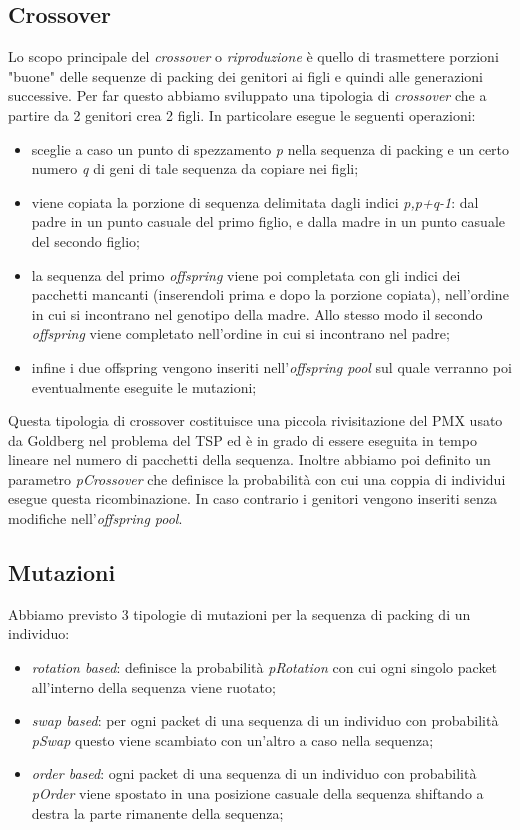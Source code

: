 \subsection{Crossover}
Lo scopo principale del \emph{crossover} o \emph{riproduzione} è quello di trasmettere porzioni "buone" delle sequenze di packing dei genitori ai figli e quindi alle generazioni successive. Per far questo abbiamo sviluppato una tipologia di \emph{crossover} che a partire da 2 genitori crea 2 figli. In particolare esegue le seguenti operazioni:
\begin{itemize}
\item sceglie a caso un punto di spezzamento \emph{p} nella sequenza di packing e un certo numero \emph{q} di geni di tale sequenza da copiare nei figli;
\item viene copiata la porzione di sequenza delimitata dagli indici \emph{p,p+q-1}: dal padre in un punto casuale del primo figlio, e dalla madre in un punto casuale del secondo figlio;
\item la sequenza del primo \emph{offspring} viene poi completata con gli indici dei pacchetti mancanti (inserendoli prima e dopo la porzione copiata), nell'ordine in cui si incontrano nel genotipo della madre. Allo stesso modo il secondo \emph{offspring} viene completato nell'ordine in cui si incontrano nel padre;
\item infine i due offspring vengono inseriti nell'\emph{offspring pool} sul quale verranno poi eventualmente eseguite le mutazioni;
\end{itemize}
Questa tipologia di crossover costituisce una piccola rivisitazione del PMX usato da Goldberg nel problema del TSP ed è in grado di essere eseguita in tempo lineare nel numero di pacchetti della sequenza. Inoltre abbiamo poi definito un parametro \emph{pCrossover} che definisce la probabilità con cui una coppia di individui esegue questa ricombinazione. In caso contrario i genitori vengono inseriti senza modifiche nell'\emph{offspring pool}.

\subsection{Mutazioni}
Abbiamo previsto 3 tipologie di mutazioni per la sequenza di packing di un individuo:
\begin{itemize}
\item \emph{rotation based}: definisce la probabilità \emph{pRotation} con cui ogni singolo packet all'interno della sequenza viene ruotato;
\item \emph{swap based}: per ogni packet di una sequenza di un individuo con probabilità \emph{pSwap} questo viene scambiato con un'altro a caso nella sequenza;
\item \emph{order based}: ogni packet di una sequenza di un individuo con probabilità \emph{pOrder} viene spostato in una posizione casuale della sequenza shiftando a destra la parte rimanente della sequenza;
\end{itemize}